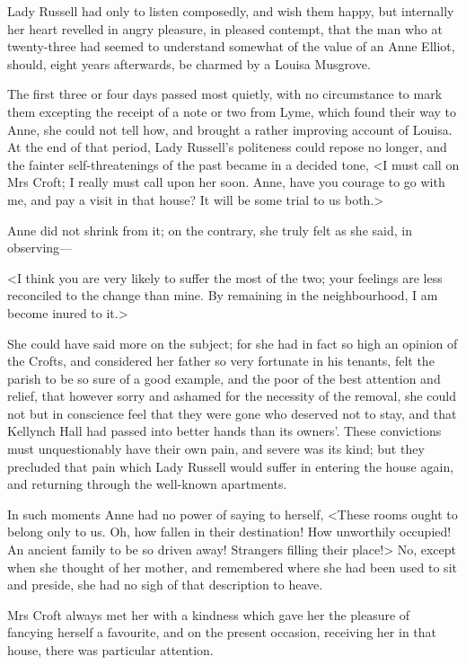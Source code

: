 Lady Russell had only to listen composedly, and wish them happy, but internally her heart revelled in angry pleasure, in pleased contempt, that the man who at twenty-three had seemed to understand somewhat of the value of an Anne Elliot, should, eight years afterwards, be charmed by a Louisa Musgrove.

The first three or four days passed most quietly, with no circumstance to mark them excepting the receipt of a note or two from Lyme, which found their way to Anne, she could not tell how, and brought a rather improving account of Louisa. At the end of that period, Lady Russell's politeness could repose no longer, and the fainter self-threatenings of the past became in a decided tone, <I must call on Mrs Croft; I really must call upon her soon. Anne, have you courage to go with me, and pay a visit in that house? It will be some trial to us both.>

Anne did not shrink from it; on the contrary, she truly felt as she said, in observing—

<I think you are very likely to suffer the most of the two; your feelings are less reconciled to the change than mine. By remaining in the neighbourhood, I am become inured to it.>

She could have said more on the subject; for she had in fact so high an opinion of the Crofts, and considered her father so very fortunate in his tenants, felt the parish to be so sure of a good example, and the poor of the best attention and relief, that however sorry and ashamed for the necessity of the removal, she could not but in conscience feel that they were gone who deserved not to stay, and that Kellynch Hall had passed into better hands than its owners'. These convictions must unquestionably have their own pain, and severe was its kind; but they precluded that pain which Lady Russell would suffer in entering the house again, and returning through the well-known apartments.

In such moments Anne had no power of saying to herself, <These rooms ought to belong only to us. Oh, how fallen in their destination! How unworthily occupied! An ancient family to be so driven away! Strangers filling their place!> No, except when she thought of her mother, and remembered where she had been used to sit and preside, she had no sigh of that description to heave.

Mrs Croft always met her with a kindness which gave her the pleasure of fancying herself a favourite, and on the present occasion, receiving her in that house, there was particular attention.

